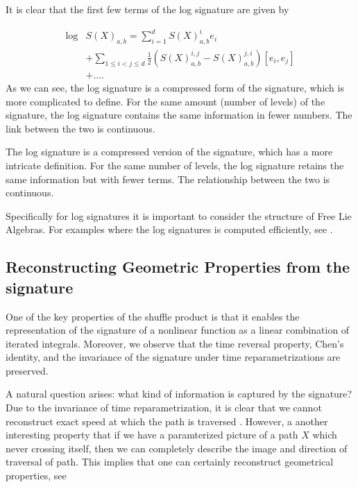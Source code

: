 It is clear that the first few terms of the log signature are given by

\begin{equation}
    \begin{aligned}
\log&  S(X)_{a,b}  = \sum_{i=1}^{d} S(X)^i_{a,b} e_i \\  &+ \sum_{1 \leq i < j \leq d} \frac{1}{2} \left( S(X)^{i,j}_{a,b}  - S(X)^{j,i}_{a,b} \right) [e_i, e_j] \\ &  + \dots .
    \end{aligned}
\end{equation}
As we can see, the log signature is a compressed form of the signature, which is more complicated to define. For the same amount (number of levels) of the signature, the log signature contains the same information in fewer numbers. The link between the two is continuous.

The log signature is a compressed version of the signature, which has a more intricate definition. For the same number of levels, the log signature retains the same information but with fewer terms. The relationship between the two is continuous.

Specifically for log signatures it is important to consider the structure of Free Lie Algebras. For examples where the log signatures is computed efficiently, see \cite{reizenstein2020algorithm, reizenstein2017calculation}.


\subsection{Reconstructing Geometric Properties from the signature}%
\label{sub:rough_paths}


One of the key properties of the shuffle product is that it enables the representation of the signature of a nonlinear function as a linear combination of iterated integrals. Moreover, we observe that the time reversal property, Chen's identity, and the invariance of the signature under time reparametrizations are preserved.

A natural question arises: what kind of information is captured by the signature?
Due to the invariance of time reparametrization, it is clear that we cannot reconstruct exact speed at which the path is traversed \cite{chevyrev2016primer}.
However, a another interesting property that if we have a paramterized picture of a path $X$ which never crossing itself, then we can completely describe the image and direction of traversal of path. This implies that one can certainly
reconstruct geometrical properties, see \cite{lyons2017hyperbolic, chang2019insertion, geng2017reconstruction}




